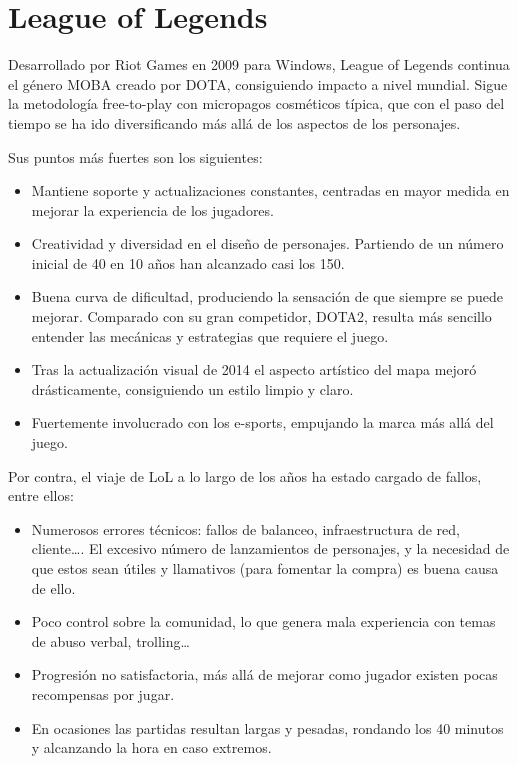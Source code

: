 \newpage

\section{League of Legends}

Desarrollado por Riot Games en 2009 para Windows, League of Legends continua el género MOBA creado por DOTA, consiguiendo impacto a nivel mundial.
Sigue la metodología free-to-play con micropagos cosméticos típica, que con el paso del tiempo se ha ido diversificando más allá de los aspectos de los personajes.

\vspace{\baselineskip}

Sus puntos más fuertes son los siguientes:

\begin{itemize}
    \item Mantiene soporte y actualizaciones constantes, centradas en mayor medida en mejorar la experiencia de los jugadores.
    \item Creatividad y diversidad en el diseño de personajes. Partiendo de un número inicial de 40 en 10 años han alcanzado casi los 150.
    \item Buena curva de dificultad, produciendo la sensación de que siempre se puede mejorar. Comparado con su gran competidor, DOTA2, resulta más sencillo entender las mecánicas y estrategias que requiere el juego.
    \item Tras la actualización visual de 2014 el aspecto artístico del mapa mejoró drásticamente, consiguiendo un estilo limpio y claro.
    \item Fuertemente involucrado con los e-sports, empujando la marca más allá del juego.
\end{itemize}

Por contra, el viaje de LoL a lo largo de los años ha estado cargado de fallos, entre ellos:

\begin{itemize}
    \item Numerosos errores técnicos: fallos de balanceo, infraestructura de red, cliente\dots. El excesivo número de lanzamientos de personajes, y la necesidad de que estos sean útiles y llamativos (para fomentar la compra) es buena causa de ello.
    \item Poco control sobre la comunidad, lo que genera mala experiencia con temas de abuso verbal, trolling\dots
    \item Progresión no satisfactoria, más allá de mejorar como jugador existen pocas recompensas por jugar.
    \item En ocasiones las partidas resultan largas y pesadas, rondando los 40 minutos y alcanzando la hora en caso extremos.
\end{itemize}


